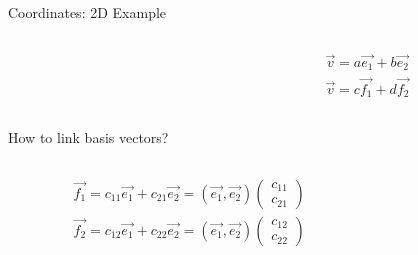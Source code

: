 \documentclass[fullscreen=true, bookmarks=true, hyperref={pdfencoding=unicode}]{beamer}
\begin{document}
\begin{frame}{Coordinates: 2D Example}
    \begin{columns}
      \begin{column}{0.4\paperwidth}
      \end{column}
      \begin{column}{0.4\paperwidth}
        \begin{align*}
          \vec{v} = a\vec{e_1} + b\vec{e_2} \\
          \vec{v} = c\vec{f_1} + d\vec{f_2}
        \end{align*}
          \end{column}
    \end{columns}
    
    \begin{center}
      How to link basis vectors?
    \end{center}

    \pause
    \begin{columns}
      \begin{column}{0.4\paperwidth}
          \begin{align*}
            \vec{f_1} = c_{11}\vec{e_1} + c_{21}\vec{e_2} = 
            (\vec{e_1}, \vec{e_2}) 
            \begin{pmatrix} c_{11} \\ c_{21} \end{pmatrix} \\
            \vec{f_2} = c_{12}\vec{e_1} + c_{22}\vec{e_2} =
            (\vec{e_1}, \vec{e_2}) 
            \begin{pmatrix} c_{12} \\ c_{22} \end{pmatrix}
          \end{align*}
      \end{column}
      \begin{column}{0.4\paperwidth}


\end{column}
\end{columns}
\end{frame}
\end{document}
